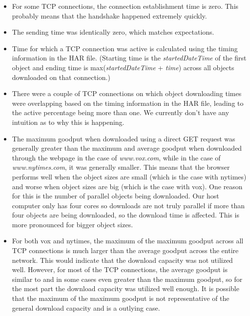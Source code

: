 \documentclass[12pt]{article}
\begin{document}
\begin{itemize}
\item For some TCP connections, the connection establishment time is zero. This probably means that the handshake happened extremely quickly.
\item The sending time was identically zero, which matches expectations.
\item Time for which a TCP connection was active is calculated using the timing information in the HAR file. (Starting time is the \emph{startedDateTime} of the first object and ending time is max(\emph{startedDateTime} + \emph{time}) across all objects downloaded on that connection.)
\item There were a couple of TCP connections on which object downloading times were overlapping based on the timing information in the HAR file, leading to the active percentage being more than one. We currently don't have any intuition as to why this is happening.
\item The maximum goodput when downloaded using a direct GET request was generally greater than the maximum and average goodput when downloaded through the webpage in the case of \emph{www.vox.com}, while in the case of \emph{www.nytimes.com}, it was generally smaller. This means that the browser performs well when the object sizes are small (which is the case with nytimes) and worse when object sizes are big (which is the case with vox). One reason for this is the number of parallel objects being downloaded. Our host computer only has four cores so downloads are not truly parallel if more than four objects are being downloaded, so the download time is affected. This is more pronounced for bigger object sizes.
\item For both vox and nytimes, the maximum of the maximum goodput across all TCP connections is much larger than the average goodput across the entire network. This would indicate that the download capacity was not utilized well. However, for most of the TCP connections, the average goodput is similar to and in some cases even greater than the maximum goodput, so for the most part the download capacity was utilized well enough. It is possible that the maximum of the maximum goodput is not representative of the general download capacity and is a outlying case.
\end{itemize}
\hspace*{-1.6cm}
\end{document}
